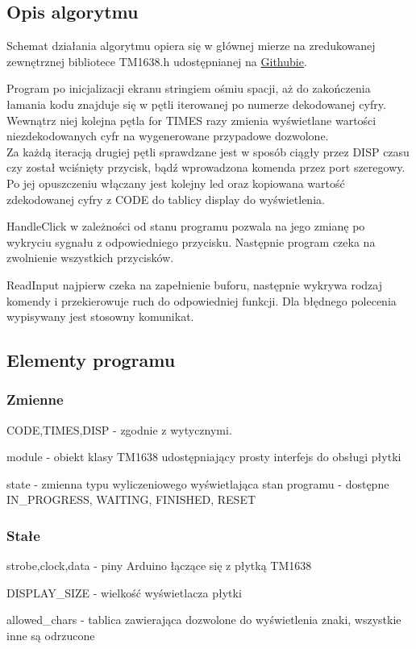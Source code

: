 \documentclass[a4paper,12pt]{article}
\begin{document}
\subsection{Opis algorytmu}
\par Schemat działania algorytmu opiera się w głównej mierze na zredukowanej zewnętrznej bibliotece TM1638.h udostępnianej na \href{https://github.com/rjbatista/tm1638-library}{Githubie}.
\par Program po inicjalizacji ekranu stringiem ośmiu spacji, aż do zakończenia łamania kodu znajduje się w pętli iterowanej po numerze dekodowanej cyfry.\\
Wewnątrz niej kolejna pętla for TIMES razy zmienia wyświetlane wartości niezdekodowanych cyfr na wygenerowane przypadowe dozwolone.\\
Za każdą iteracją drugiej pętli sprawdzane jest w sposób ciągły przez DISP czasu czy został wciśnięty przycisk, bądź wprowadzona komenda przez port szeregowy.\\
Po jej opuszczeniu włączany jest kolejny led oraz kopiowana wartość zdekodowanej cyfry z CODE do tablicy display do wyświetlenia.
\par HandleClick w zależności od stanu programu pozwala na jego zmianę po wykryciu sygnału z odpowiedniego przycisku.
Następnie program czeka na zwolnienie wszystkich przycisków.
\par ReadInput najpierw czeka na zapełnienie buforu, następnie wykrywa rodzaj komendy i przekierowuje ruch do odpowiedniej funkcji. Dla błędnego polecenia wypisywany jest stosowny komunikat.
\subsection{Elementy programu}

\subsubsection{Zmienne}
\par CODE,TIMES,DISP - zgodnie z wytycznymi.
\par module - obiekt klasy TM1638 udostępniający prosty interfejs do obsługi płytki
\par state - zmienna typu wyliczeniowego wyświetlająca stan programu - dostępne IN\_PROGRESS, WAITING, FINISHED, RESET
\subsubsection{Stałe}
\par strobe,clock,data - piny Arduino łączące się z płytką TM1638
\par DISPLAY\_SIZE - wielkość wyświetlacza płytki
\par allowed\_chars - tablica zawierająca dozwolone do wyświetlenia znaki, wszystkie inne są odrzucone
\end{document}
